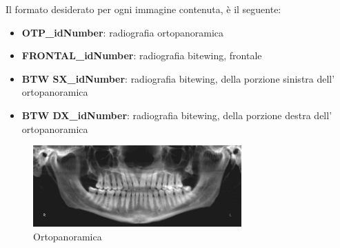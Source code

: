 \documentclass[12pt,a4paper,openright,twoside]{book}
\begin{document}
Il formato desiderato per ogni immagine contenuta, è il seguente:
\begin{itemize}
\item \textbf{OTP\_idNumber}: radiografia ortopanoramica
\item \textbf{FRONTAL\_idNumber}: radiografia bitewing, frontale
\item \textbf{BTW SX\_idNumber}: radiografia bitewing, della porzione sinistra dell' ortopanoramica
\item \textbf{BTW DX\_idNumber}: radiografia bitewing, della porzione destra dell' ortopanoramica
\end{itemize}

\begin{figure}[H]
    \centering
    \includegraphics[width=8cm]{figures/opt.pdf}
    \caption{Ortopanoramica}
    \label{fig:opt}
\end{figure}
\end{document}

